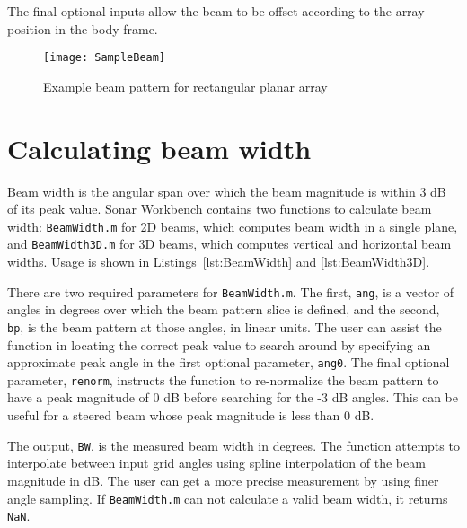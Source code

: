 The final optional inputs allow the beam to be offset according to the array position in the body frame. 



\clearpage
\begin{sidewaysfigure}[!ht]
\begin{center}
\texttt{[image: SampleBeam]}
\caption{\label{fig:SampleBeam}Example beam pattern for rectangular planar array}
\end{center}
\end{sidewaysfigure}

\clearpage
\section{Calculating beam width}

Beam width is the angular span over which the beam magnitude is within 3 dB of its peak value. Sonar Workbench contains two functions to calculate beam width: \texttt{BeamWidth.m} for 2D beams, which computes beam width in a single plane, and \texttt{BeamWidth3D.m} for 3D beams, which computes vertical and horizontal beam widths. Usage is shown in Listings~\ref{lst:BeamWidth} and \ref{lst:BeamWidth3D}.





There are two required parameters for \texttt{BeamWidth.m}. The first, \texttt{ang}, is a vector of angles in degrees over which the beam pattern slice is defined, and the second, \texttt{bp}, is the beam pattern at those angles, in linear units. The user can assist the function in locating the correct peak value to search around by specifying an approximate peak angle in the first optional parameter, \texttt{ang0}. The final optional parameter, \texttt{renorm}, instructs the function to re-normalize the beam pattern to have a peak magnitude of 0 dB before searching for the -3 dB angles. This can be useful for a steered beam whose peak magnitude is less than 0 dB. 

The output, \texttt{BW}, is the measured beam width in degrees. The function attempts to interpolate between input grid angles using spline interpolation of the beam magnitude in dB. The user can get a more precise measurement by using finer angle sampling. If \texttt{BeamWidth.m} can not calculate a valid beam width, it returns \texttt{NaN}.

